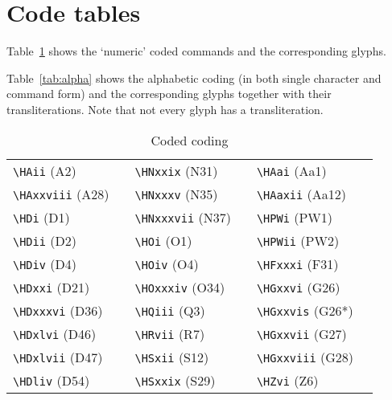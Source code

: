 \documentclass{article}
\begin{document}
\section{Code tables}

Table~\ref{tab:coded} 
shows the `numeric' coded commands and the corresponding
glyphs. 

Table~\ref{tab:alpha} 
shows the alphabetic coding (in both single
character and command form) and the corresponding glyphs together with their
transliterations. Note that not every glyph has a transliteration.



\begin{table}
\centering
\caption{Coded coding} \label{tab:coded}
\begin{tabular}{|l|c||l|c||l|c|} \hline
\verb|\HAii| (A2)     & \textpmhg{\HAii}      & \verb|\HNxxix| (N31)   & \textpmhg{\HNxxix}   & \verb|\HAai| (Aa1)    & \textpmhg{\HAai} \\
\verb|\HAxxviii| (A28) & \textpmhg{\HAxxviii} & \verb|\HNxxxv| (N35)   & \textpmhg{\HNxxxv}   & \verb|\HAaxii| (Aa12) & \textpmhg{\HAaxii} \\
\verb|\HDi| (D1)      & \textpmhg{\HDi}       & \verb|\HNxxxvii| (N37) & \textpmhg{\HNxxxvii} & \verb|\HPWi| (PW1)    & \textpmhg{\HPWi} \\
\verb|\HDii| (D2)     & \textpmhg{\HDii}      & \verb|\HOi| (O1)       & \textpmhg{\HOi}      & \verb|\HPWii| (PW2)   & \textpmhg{\HPWii} \\
\verb|\HDiv| (D4)     & \textpmhg{\HDiv}      & \verb|\HOiv| (O4)      & \textpmhg{\HOiv}     & \verb|\HFxxxi| (F31)  & \textpmhg{\HFxxxi} \\
\verb|\HDxxi| (D21)   & \textpmhg{\HDxxi}     & \verb|\HOxxxiv| (O34)  & \textpmhg{\HOxxxiv}  & \verb|\HGxxvi| (G26)  & \textpmhg{\HGxxvi} \\
\verb|\HDxxxvi| (D36) & \textpmhg{\HDxxxvi}   & \verb|\HQiii| (Q3)     & \textpmhg{\HQiii}    & \verb|\HGxxvis| (G26*) & \textpmhg{\HGxxvis} \\
\verb|\HDxlvi| (D46)  & \textpmhg{\HDxlvi}    & \verb|\HRvii| (R7)     & \textpmhg{\HRvii}    & \verb|\HGxxvii| (G27) & \textpmhg{\HGxxvii} \\
\verb|\HDxlvii| (D47) & \textpmhg{\HDxlvii}   & \verb|\HSxii| (S12)    & \textpmhg{\HSxii}    & \verb|\HGxxviii| (G28) & \textpmhg{\HGxxviii} \\
\verb|\HDliv| (D54)   & \textpmhg{\HDliv}     & \verb|\HSxxix| (S29)   & \textpmhg{\HSxxix}   & \verb|\HZvi| (Z6)     & \textpmhg{\HZvi} \\

\end{tabular}
\end{table}
\end{document}
